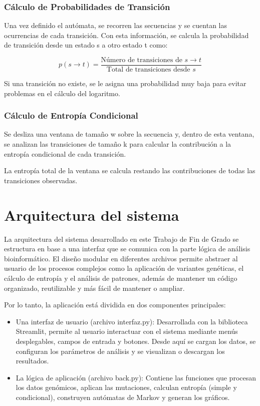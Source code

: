 \documentclass[11pt,spanish,listoffigures,listoftables]{tfgetsinf}
\begin{document}
\subsubsection{Cálculo de Probabilidades de Transición}
Una vez definido el autómata, se recorren las secuencias y se cuentan las ocurrencias de cada transición. Con esta información, se calcula la probabilidad de transición desde un estado s a otro estado t como:

\[
p(s \to t) = \frac{\text{Número de transiciones de } s \to t}{\text{Total de transiciones desde } s}
\]

Si una transición no existe, se le asigna una probabilidad muy baja para evitar problemas en el cálculo del logaritmo.

\subsubsection{Cálculo de Entropía Condicional}

Se desliza una ventana de tamaño w sobre la secuencia y, dentro de esta ventana, se analizan las transiciones de tamaño k para calcular la contribución a la entropía condicional de cada transición.

La entropía total de la ventana se calcula restando las contribuciones de todas las transiciones observadas.


\section{Arquitectura del sistema}

La arquitectura del sistema desarrollado en este Trabajo de Fin de Grado se estructura en base a una interfaz que se comunica con la parte lógica de análisis bioinformático. El diseño modular en diferentes archivos permite abstraer al usuario de los procesos complejos como la aplicación de variantes genéticas, el cálculo de entropía y el análisis de patrones, además de mantener un código organizado, reutilizable y más fácil de mantener o ampliar. 

 

Por lo tanto, la aplicación está dividida en dos componentes principales: 

\begin{itemize}
   \item Una interfaz de usuario (archivo interfaz.py): Desarrollada con la biblioteca Streamlit, permite al usuario interactuar con el sistema mediante menús desplegables, campos de entrada y botones. Desde aquí se cargan los datos, se configuran los parámetros de análisis y se visualizan o descargan los resultados. 
   \item La lógica de aplicación (archivo back.py): Contiene las funciones que procesan los datos genómicos, aplican las mutaciones, calculan entropía (simple y condicional), construyen autómatas de Markov y generan los gráficos. 
\end{itemize}
\end{document}
